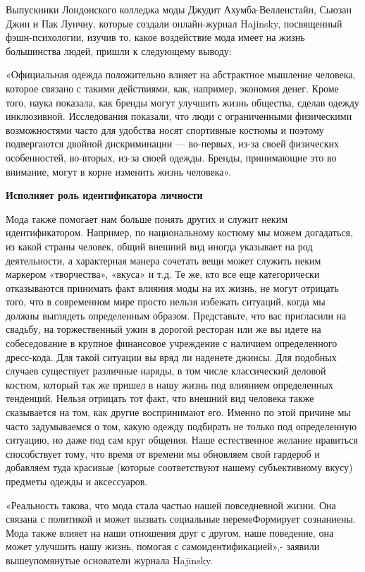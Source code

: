 Выпускники Лондонского колледжа моды Джудит Ахумба-Велленстайн, Сьюзан Джин и Пак Лунчиу, которые создали онлайн-журнал Hajinsky, посвященный фэшн-психологии, изучив то, какое воздействие мода имеет на жизнь большинства людей, пришли к следующему выводу:

\begin{fancyquotes}
    «Официальная одежда положительно влияет на абстрактное мышление человека, которое связано с такими действиями, как, например, экономия денег. Кроме того, наука показала, как бренды могут улучшить жизнь общества, сделав одежду инклюзивной. Исследования показали, что люди с ограниченными физическими возможностями часто для удобства носят спортивные костюмы и поэтому подвергаются двойной дискриминации — во-первых, из-за своей физических особенностей, во-вторых, из-за своей одежды. Бренды, принимающие это во внимание, могут в корне изменить жизнь человека».
\end{fancyquotes}

\textbf{Исполняет роль идентификатора личности}

Мода также помогает нам больше понять других и служит неким идентификатором. Например, по национальному костюму мы можем догадаться, из какой страны человек, общий внешний вид иногда указывает на род деятельности, а характерная манера сочетать вещи может служить неким маркером «творчества», «вкуса» и т.д. Те же, кто все еще категорически отказываются принимать факт влияния моды на их жизнь, не могут отрицать того, что в современном мире просто нельзя избежать ситуаций, когда мы должны выглядеть определенным образом. Представьте, что вас пригласили на свадьбу, на торжественный ужин в дорогой ресторан или же вы идете на собеседование в крупное финансовое учреждение с наличием определенного дресс-кода. Для такой ситуации вы вряд ли наденете джинсы. Для подобных случаев существует различные наряды, в том числе классический деловой костюм, который так же пришел в нашу жизнь под влиянием определенных тенденций. Нельзя отрицать тот факт, что внешний вид человека также сказывается на том, как другие воспринимают его. Именно по этой причине мы часто задумываемся о том, какую одежду подбирать не только под определенную ситуацию, но даже под сам круг общения. Наше естественное желание нравиться способствует тому, что время от времени мы обновляем свой гардероб и добавляем туда красивые (которые соответствуют нашему субъективному вкусу) предметы одежды и аксессуаров.

\begin{fancyquotes}
    «Реальность такова, что мода стала частью нашей повседневной жизни. Она связана с политикой и может вызвать социальные перемеФормирует сознаниены. Мода также влияет на наши отношения друг с другом, наше поведение, она может улучшить нашу жизнь, помогая с самоидентификацией»,- заявили вышеупомянутые основатели журнала Hajinsky.
\end{fancyquotes}

